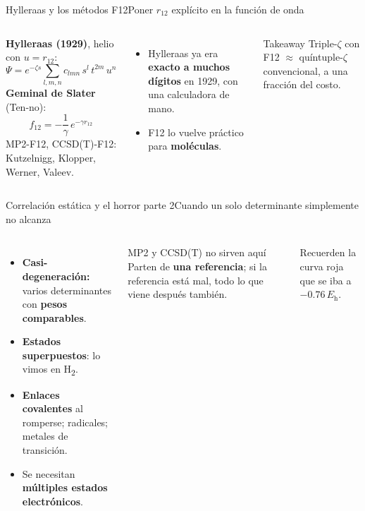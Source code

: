 \documentclass[aspectratio=169]{beamer}
\newcommand{\cplx}[1]{{\footnotesize\color{cookieMuted}#1}}
\newcommand{\Eh}{E_\mathrm{h}}
\begin{document}
\begin{frame}{Hylleraas y los métodos F12}{Poner $r_{12}$ explícito en la función de onda}
  \begin{columns}[T,onlytextwidth]
      \textbf{Hylleraas (1929)}, helio con $u=r_{12}$:
      \[ \Psi=e^{-\zeta s}\sum_{l,m,n}c_{lmn}\,s^{l}\,t^{2m}\,u^{n} \]
      \textbf{Geminal de Slater} (Ten-no):
      \[ f_{12}=-\frac{1}{\gamma}\,e^{-\gamma r_{12}} \]
      \cplx{MP2-F12, CCSD(T)-F12: Kutzelnigg, Klopper, Werner, Valeev.}
      \begin{itemize}\setlength\itemsep{4pt}
        \item Hylleraas ya era \textbf{exacto a muchos dígitos} en 1929, con una calculadora de mano.
        \item F12 lo vuelve práctico para \textbf{moléculas}.
      \end{itemize}
      \begin{exampleblock}{Takeaway}
        Triple-$\zeta$ con F12 $\approx$ quíntuple-$\zeta$ convencional, a una fracción del costo.
      \end{exampleblock}
  \end{columns}
\end{frame}

\begin{frame}{Correlación estática y el horror parte 2}{Cuando un solo determinante simplemente no alcanza}
  \begin{columns}[T,onlytextwidth]
      \begin{itemize}\setlength\itemsep{5pt}
        \item \textbf{Casi-degeneración:} varios determinantes con \textbf{pesos comparables}.
        \item \textbf{Estados superpuestos}: lo vimos en H\textsubscript{2}.
        \item \textbf{Enlaces covalentes} al romperse; radicales; metales de transición.
        \item Se necesitan \textbf{múltiples estados electrónicos}.
      \end{itemize}
      \begin{alertblock}{MP2 y CCSD(T) no sirven aquí}
        Parten de \textbf{una referencia}; si la referencia está mal, todo lo que viene después también.
      \end{alertblock}
      \cplx{Recuerden la curva roja que se iba a $-0.76\,\Eh$.}
  \end{columns}
\end{frame}
\end{document}
